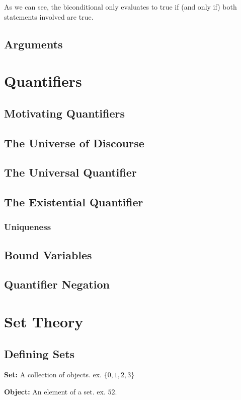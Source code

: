 \documentclass{article}
\begin{document}
As we can see, the biconditional only evaluates to true if (and only if) both statements
involved are true.

\subsection{Arguments}

\section{Quantifiers}
\subsection{Motivating Quantifiers}
\subsection{The Universe of Discourse}
\subsection{The Universal Quantifier}
\subsection{The Existential Quantifier}
\subsubsection{Uniqueness}
\subsection{Bound Variables}
\subsection{Quantifier Negation}

\section{Set Theory}
\subsection{Defining Sets}
\textbf{Set:} A collection of objects. ex. $\{0, 1, 2, 3\}$

\noindent \textbf{Object:} An element of a set. ex. $52$.
\end{document}
